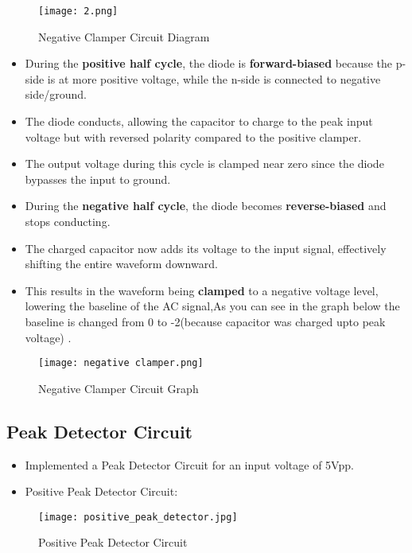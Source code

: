 \documentclass[9pt,conference]{IEEEtran}
\begin{document}
\begin{figure}[H]
    \centering
    \texttt{[image: 2.png]}
    \caption{Negative Clamper Circuit Diagram}
    \label{fig:negative_clamper}
\end{figure}
\begin{itemize}
    \item During the \textbf{positive half cycle}, the diode is \textbf{forward-biased} because the p-side is at more positive voltage, while the n-side is connected to negative side/ground.
    \item The diode conducts, allowing the capacitor to charge to the peak input voltage but with reversed polarity compared to the positive clamper.
    \item The output voltage during this cycle is clamped near zero since the diode bypasses the input to ground.
    \item During the \textbf{negative half cycle}, the diode becomes \textbf{reverse-biased} and stops conducting.
    \item The charged capacitor now adds its voltage to the input signal, effectively shifting the entire waveform downward.
    \item This results in the waveform being \textbf{clamped} to a negative voltage level, lowering the baseline of the AC signal,As you can see in the graph below the baseline is changed from 0 to -2(because capacitor was charged upto peak voltage) .
\end{itemize}

\begin{figure}[H]
    \centering
    \texttt{[image: negative clamper.png]}
    \caption{Negative Clamper Circuit Graph}
    \label{fig:negative_clamper}
\end{figure}



\subsection{Peak Detector Circuit}
\begin{itemize}
    \item Implemented a Peak Detector Circuit for an input voltage of 5Vpp.
    \item Positive Peak Detector Circuit:
\end{itemize}
\begin{figure}[H]
    \centering
    \texttt{[image: positive\_peak\_detector.jpg]}
    \caption{Positive Peak Detector Circuit}
    \label{fig:clamper_circuit}
\end{figure}
\end{document}
